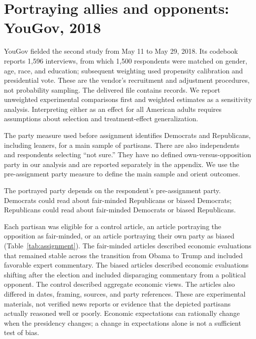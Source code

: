 \documentclass[11pt]{article}
\begin{document}
\section{Portraying allies and opponents: YouGov, 2018}
YouGov fielded the second study from May 11 to May 29, 2018. Its codebook reports 1,596 interviews, from which 1,500 respondents were matched on gender, age, race, and education; subsequent weighting used propensity calibration and presidential vote. These are the vendor's recruitment and adjustment procedures, not probability sampling. The delivered file contains \YgRaw{} records. We report unweighted experimental comparisons first and weighted estimates as a sensitivity analysis. Interpreting either as an effect for all American adults requires assumptions about selection and treatment-effect generalization.

The party measure used before assignment identifies \YgDemN{} Democrats and \YgRepN{} Republicans, including leaners, for a main sample of \YgN{} partisans. There are also \YgIndependentN{} independents and \YgUnalignedN{} respondents selecting ``not sure.'' They have no defined own-versus-opposition party in our analysis and are reported separately in the appendix. We use the pre-assignment party measure to define the main sample and orient outcomes.

\begin{table}[!htbp]
\centering
\caption{The three arms available to each partisan group in YouGov.}
\label{tab:assignment}
\begin{minipage}{\linewidth}\footnotesize
The portrayed party depends on the respondent's pre-assignment party. Democrats could read about fair-minded Republicans or biased Democrats; Republicans could read about fair-minded Democrats or biased Republicans.
\end{minipage}
\end{table}

Each partisan was eligible for a control article, an article portraying the opposition as fair-minded, or an article portraying their own party as biased (Table~\ref{tab:assignment}). The fair-minded articles described economic evaluations that remained stable across the transition from Obama to Trump and included favorable expert commentary. The biased articles described economic evaluations shifting after the election and included disparaging commentary from a political opponent. The control described aggregate economic views. The articles also differed in dates, framing, sources, and party references. These are experimental materials, not verified news reports or evidence that the depicted partisans actually reasoned well or poorly. Economic expectations can rationally change when the presidency changes; a change in expectations alone is not a sufficient test of bias.
\end{document}
